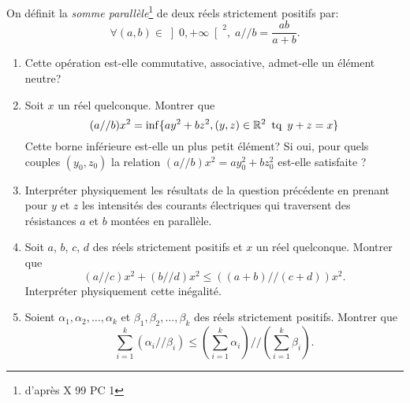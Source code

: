 On définit la \emph{somme parallèle}\footnote{d'après X 99 PC 1}
de deux réels strictement positifs par:
\[
 \forall (a,b) \in \left] 0,+\infty\right[ ^{2} ,\; a//b=\frac{ab}{a+b}.
\]

\begin{enumerate}
\item Cette opération est-elle commutative, associative, admet-elle un élément neutre?

\item Soit $x$ un réel quelconque.
Montrer que
\[(a//b)x^2=\inf \{ay^{2}+bz^{2},(y,z)\in \mathbb{R}^{2}\,\text{ tq }\,y+z=x\}\]
Cette borne inférieure est-elle un plus petit élément?\newline
Si oui, pour quels couples $(y_0,z_0)$ la relation $(a//b)x^{2}=ay_0^{2}+bz_0^{2}$ est-elle satisfaite ?

\item Interpréter physiquement les résultats de la question précédente en prenant pour $y$ et $z$ les intensités des courants électriques qui traversent des résistances $a$ et $b$ montées en parall{\`e}le.

\item Soit $a$, $b$, $c$, $d$ des réels strictement positifs et $x$ un réel quelconque. Montrer que
\[(a//c)x^{2}+(b//d)x^{2}\leq ((a+b)//(c+d))x^{2}.\]
Interpréter physiquement cette inégalité.

\item Soient $\alpha_1,\alpha_2,\ldots,\alpha_k$ et $\beta_1,\beta_2,\ldots,\beta_k$ des réels strictement positifs. Montrer que
\[\sum_{i=1}^{k}(\alpha_i//\beta_i)\leq \left (\sum_{i=1}^{k}\alpha_i\right)// \left (\sum_{i=1}^{k}\beta_i\right).\]
\end{enumerate}

